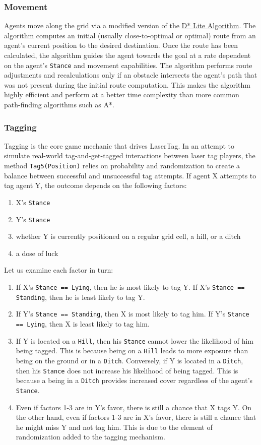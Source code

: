 \documentclass[a4paper,english,DIV=16,11pt,parskip=half,dvipsnames,listof=totoc,index=totoc,bibliography=totoc]{scrartcl}
\begin{document}
\subsubsection{Movement} \label{sssec:movement}
Agents move along the grid via a modified version of the \href{http://idm-lab.org/bib/abstracts/papers/aaai02b.pdf}{D* Lite Algorithm}. The algorithm computes an initial (usually close-to-optimal or optimal) route from an agent's current position to the desired destination. Once the route has been calculated, the algorithm guides the agent towards the goal at a rate dependent on the agent's \texttt{Stance} and movement capabilities. The algorithm performs route adjustments and recalculations only if an obstacle intersects the agent's path that was not present during the initial route computation. This makes the algorithm highly efficient and perform at a better time complexity than more common path-finding algorithms such as A*.
%
\subsubsection{Tagging} \label{sssec:tagging}
Tagging is the core game mechanic that drives LaserTag. In an attempt to simulate real-world tag-and-get-tagged interactions between laser tag players, the method \texttt{Tag5(Position)} relies on probability and randomization to create a balance between successful and unsuccessful tag attempts. If agent X attempts to tag agent Y, the outcome depends on the following factors:
%
\begin{enumerate}
  \item X's \texttt{Stance}
  \item Y's \texttt{Stance}
  \item whether Y is currently positioned on a regular grid cell, a hill, or a ditch
  \item a dose of luck
\end{enumerate}
%
Let us examine each factor in turn:
%
\begin{enumerate}
  \item If X's \texttt{Stance == Lying}, then he is most likely to tag Y. If X's \texttt{Stance == Standing}, then he is least likely to tag Y.
  \item If Y's \texttt{Stance == Standing}, then X is most likely to tag him. If Y's \texttt{Stance == Lying}, then X is least likely to tag him.
  \item If Y is located on a \texttt{Hill}, then his \texttt{Stance} cannot lower the likelihood of him being tagged. This is because being on a \texttt{Hill} leads to more exposure than being on the ground or in a \texttt{Ditch}. Conversely, if Y is located in a \texttt{Ditch}, then his \texttt{Stance} does not increase his likelihood of being tagged. This is because a being in a \texttt{Ditch} provides increased cover regardless of the agent's \texttt{Stance}.
  \item Even if factors 1-3 are in Y's favor, there is still a chance that X tags Y. On the other hand, even if factors 1-3 are in X's favor, there is still a chance that he might miss Y and not tag him. This is due to the element of randomization added to the tagging mechanism.
\end{enumerate}
%
\end{document}
